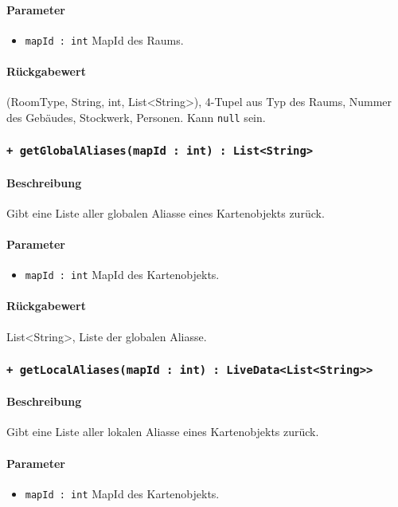 \paragraph*{Parameter}
\begin{itemize}
    \item \texttt{mapId : int} MapId des Raums.
\end{itemize}
\paragraph*{Rückgabewert}
(RoomType, String, int, List<String>), 4-Tupel aus Typ des Raums, Nummer des Gebäudes, Stockwerk, Personen. Kann \texttt{null} sein.

\subsubsection*{\texttt{+ getGlobalAliases(mapId : int) : List<String>}}%
\paragraph*{Beschreibung}
Gibt eine Liste aller globalen Aliasse eines Kartenobjekts zurück.
\paragraph*{Parameter}
\begin{itemize}
    \item \texttt{mapId : int} MapId des Kartenobjekts.
\end{itemize}
\paragraph*{Rückgabewert}
List<String>, Liste der globalen Aliasse.

\subsubsection*{\texttt{+ getLocalAliases(mapId : int) : LiveData<List<String>>}}%
\paragraph*{Beschreibung}
Gibt eine Liste aller lokalen Aliasse eines Kartenobjekts zurück.
\paragraph*{Parameter}
\begin{itemize}
    \item \texttt{mapId : int} MapId des Kartenobjekts.
\end{itemize}
